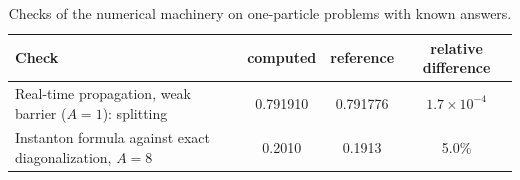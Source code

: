 \begin{table}[ht]
\centering
\footnotesize
\caption{Checks of the numerical machinery on one-particle problems with known answers.}
\label{tab:checks}
\begin{tabular}{L{6.8cm}ccc}
\toprule
Check & computed & reference & relative difference \\
\midrule
Real-time propagation, weak barrier ($A=1$): splitting & 0.791910 & 0.791776 & $\ensuremath{1.7\times10^{-4}}$ \\
Instanton formula against exact diagonalization, $A=8$ & 0.2010 & 0.1913 & 5.0\% \\
\bottomrule
\end{tabular}
\end{table}
